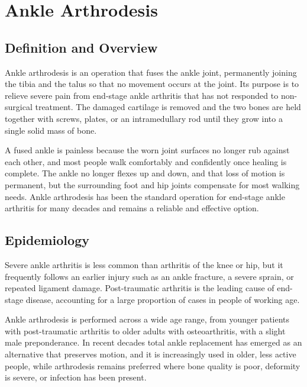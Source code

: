 \chapter{Ankle Arthrodesis}

\section*{Definition and Overview}
Ankle arthrodesis is an operation that fuses the ankle joint, permanently joining the tibia and the talus so that no movement occurs at the joint. Its purpose is to relieve severe pain from end-stage ankle arthritis that has not responded to non-surgical treatment. The damaged cartilage is removed and the two bones are held together with screws, plates, or an intramedullary rod until they grow into a single solid mass of bone.

A fused ankle is painless because the worn joint surfaces no longer rub against each other, and most people walk comfortably and confidently once healing is complete. The ankle no longer flexes up and down, and that loss of motion is permanent, but the surrounding foot and hip joints compensate for most walking needs. Ankle arthrodesis has been the standard operation for end-stage ankle arthritis for many decades and remains a reliable and effective option.

\section*{Epidemiology}
Severe ankle arthritis is less common than arthritis of the knee or hip, but it frequently follows an earlier injury such as an ankle fracture, a severe sprain, or repeated ligament damage. Post-traumatic arthritis is the leading cause of end-stage disease, accounting for a large proportion of cases in people of working age.

Ankle arthrodesis is performed across a wide age range, from younger patients with post-traumatic arthritis to older adults with osteoarthritis, with a slight male preponderance. In recent decades total ankle replacement has emerged as an alternative that preserves motion, and it is increasingly used in older, less active people, while arthrodesis remains preferred where bone quality is poor, deformity is severe, or infection has been present.

